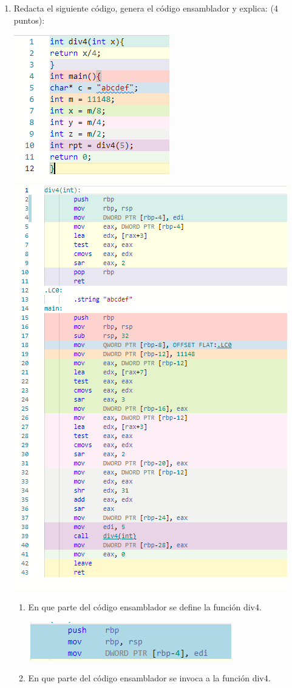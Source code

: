 \documentclass{article}
\begin{document}
\begin{enumerate}
        \item Redacta el siguiente código, genera el código ensamblador y explica: (4 puntos):
        \begin{center}
            \includegraphics[width=.3\textwidth]{Imagenes/ejercicio 5.png}
            \includegraphics[width=.6\textwidth]{Imagenes/ejercicio 5.1.png}
        \end{center}
        \begin{enumerate}
            \item En que parte del código ensamblador se define la función div4.
                \begin{center}
		              \includegraphics[width=.7\textwidth]{Imagenes/ejercicio 5 a.png}
		        \end{center}
            \item En que parte del código ensamblador se invoca a la función div4.

\end{enumerate}
\end{enumerate}
\end{document}
